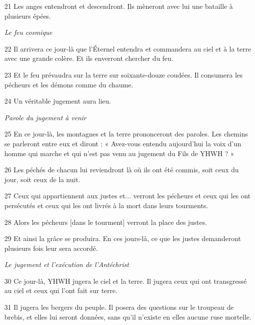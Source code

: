 \par 21 Les anges entendront et descendront. Ils mèneront avec lui une bataille à plusieurs épées.

\par \textit{Le feu cosmique}

\par 22 Il arrivera ce jour-là que l'Éternel entendra et commandera au ciel et à la terre avec une grande colère. Et ils enverront chercher du feu.

\par 23 Et le feu prévaudra sur la terre sur soixante-douze coudées. Il consumera les pécheurs et les démons comme du chaume.

\par 24 Un véritable jugement aura lieu.

\par \textit{Parole du jugement à venir}

\par 25 En ce jour-là, les montagnes et la terre prononceront des paroles. Les chemins se parleront entre eux et diront : « Avez-vous entendu aujourd'hui la voix d'un homme qui marche et qui n'est pas venu au jugement du Fils de YHWH ? »

\par 26 Les péchés de chacun lui reviendront là où ils ont été commis, soit ceux du jour, soit ceux de la nuit.

\par 27 Ceux qui appartiennent aux justes et... verront les pécheurs et ceux qui les ont persécutés et ceux qui les ont livrés à la mort dans leurs tourments.

\par 28 Alors les pécheurs [dans le tourment] verront la place des justes.

\par 29 Et ainsi la grâce se produira. En ces jours-là, ce que les justes demanderont plusieurs fois leur sera accordé.

\par \textit{Le jugement et l'exécution de l'Antéchrist}

\par 30 Ce jour-là, YHWH jugera le ciel et la terre. Il jugera ceux qui ont transgressé au ciel et ceux qui l’ont fait sur terre.

\par 31 Il jugera les bergers du peuple. Il posera des questions sur le troupeau de brebis, et elles lui seront données, sans qu'il n'existe en elles aucune ruse mortelle.

